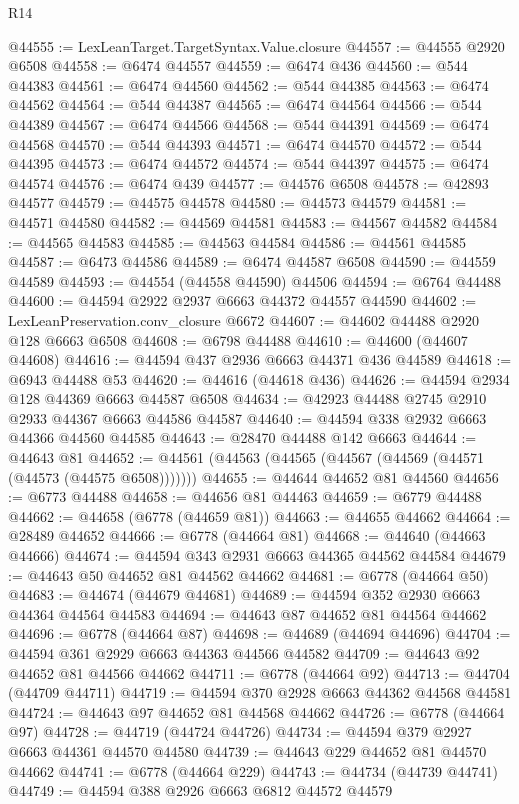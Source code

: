 \begin{lexlean}{R14}
\begin{coremodule}
@44555 := LexLeanTarget.TargetSyntax.Value.closure
@44557 := @44555 @2920 @6508
@44558 := @6474 @44557
@44559 := @6474 @436
@44560 := @544 @44383
@44561 := @6474 @44560
@44562 := @544 @44385
@44563 := @6474 @44562
@44564 := @544 @44387
@44565 := @6474 @44564
@44566 := @544 @44389
@44567 := @6474 @44566
@44568 := @544 @44391
@44569 := @6474 @44568
@44570 := @544 @44393
@44571 := @6474 @44570
@44572 := @544 @44395
@44573 := @6474 @44572
@44574 := @544 @44397
@44575 := @6474 @44574
@44576 := @6474 @439
@44577 := @44576 @6508
@44578 := @42893 @44577
@44579 := @44575 @44578
@44580 := @44573 @44579
@44581 := @44571 @44580
@44582 := @44569 @44581
@44583 := @44567 @44582
@44584 := @44565 @44583
@44585 := @44563 @44584
@44586 := @44561 @44585
@44587 := @6473 @44586
@44589 := @6474 @44587 @6508
@44590 := @44559 @44589
@44593 := @44554 (@44558 @44590) @44506
@44594 := @6764 @44488
@44600 := @44594 @2922 @2937 @6663 @44372 @44557 @44590
@44602 := LexLeanPreservation.conv_closure @6672
@44607 := @44602 @44488 @2920 @128 @6663 @6508
@44608 := @6798 @44488
@44610 := @44600 (@44607 @44608)
@44616 := @44594 @437 @2936 @6663 @44371 @436 @44589
@44618 := @6943 @44488 @53
@44620 := @44616 (@44618 @436)
@44626 := @44594 @2934 @128 @44369 @6663 @44587 @6508
@44634 := @42923 @44488 @2745 @2910 @2933 @44367 @6663 @44586 @44587
@44640 := @44594 @338 @2932 @6663 @44366 @44560 @44585
@44643 := @28470 @44488 @142 @6663
@44644 := @44643 @81
@44652 := @44561 (@44563 (@44565 (@44567 (@44569 (@44571 (@44573 (@44575 @6508)))))))
@44655 := @44644 @44652 @81 @44560
@44656 := @6773 @44488
@44658 := @44656 @81 @44463
@44659 := @6779 @44488
@44662 := @44658 (@6778 (@44659 @81))
@44663 := @44655 @44662
@44664 := @28489 @44652
@44666 := @6778 (@44664 @81)
@44668 := @44640 (@44663 @44666)
@44674 := @44594 @343 @2931 @6663 @44365 @44562 @44584
@44679 := @44643 @50 @44652 @81 @44562 @44662
@44681 := @6778 (@44664 @50)
@44683 := @44674 (@44679 @44681)
@44689 := @44594 @352 @2930 @6663 @44364 @44564 @44583
@44694 := @44643 @87 @44652 @81 @44564 @44662
@44696 := @6778 (@44664 @87)
@44698 := @44689 (@44694 @44696)
@44704 := @44594 @361 @2929 @6663 @44363 @44566 @44582
@44709 := @44643 @92 @44652 @81 @44566 @44662
@44711 := @6778 (@44664 @92)
@44713 := @44704 (@44709 @44711)
@44719 := @44594 @370 @2928 @6663 @44362 @44568 @44581
@44724 := @44643 @97 @44652 @81 @44568 @44662
@44726 := @6778 (@44664 @97)
@44728 := @44719 (@44724 @44726)
@44734 := @44594 @379 @2927 @6663 @44361 @44570 @44580
@44739 := @44643 @229 @44652 @81 @44570 @44662
@44741 := @6778 (@44664 @229)
@44743 := @44734 (@44739 @44741)
@44749 := @44594 @388 @2926 @6663 @6812 @44572 @44579

\end{coremodule}
\end{lexlean}

